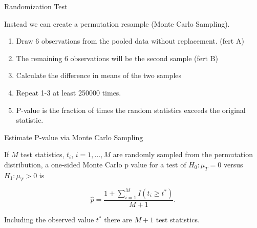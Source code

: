 \documentclass[9pt,ignorenonframetext,]{beamer}
\begin{document}
\begin{frame}{Randomization Test}

Instead we can create a permutation resample (Monte Carlo Sampling).

\begin{enumerate}
\def\labelenumi{\arabic{enumi}.}
\item
  Draw 6 observations from the pooled data without replacement. (fert A)
\item
  The remaining 6 observations will be the second sample (fert B)
\item
  Calculate the difference in means of the two samples
\item
  Repeat 1-3 at least 250000 times.
\item
  P-value is the fraction of times the random statistics exceeds the
  original statistic.
\end{enumerate}

\end{frame}

\begin{frame}{Estimate P-value via Monte Carlo Sampling}

If \(M\) test statistics, \(t_i\), \(i=1,...,M\) are randomly sampled
from the permutation distribution, a one-sided Monte Carlo p value for a
test of \(H_0: \mu_T=0\) versus \(H_1: \mu_T > 0\) is

\[ {\hat p} = \frac {1+\sum_{i=1}^M I(t_i \ge t^{*})}{M+1}.\]

Including the observed value \(t^{*}\) there are \(M+1\) test
statistics.

\end{frame}
\end{document}
